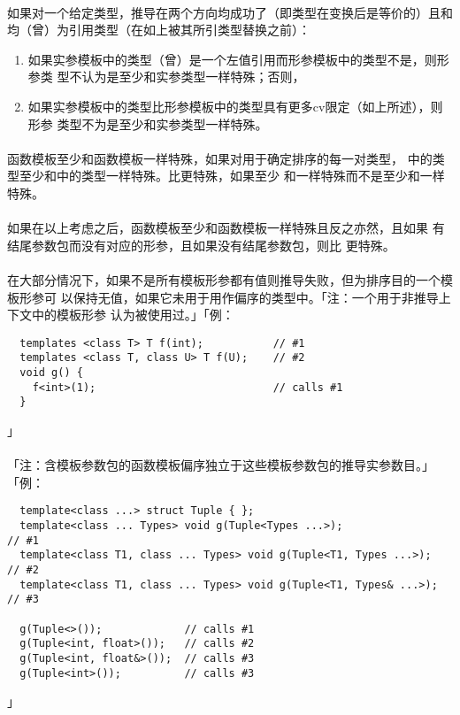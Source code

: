 \paragraph{}
如果对一个给定类型，推导在两个方向均成功了（即类型在变换后是等价的）且和
均（曾）为引用类型（在如上被其所引类型替换之前）：
\begin{enumerate}
  \item{如果实参模板中的类型（曾）是一个左值引用而形参模板中的类型不是，则形参类
    型不认为是至少和实参类型一样特殊；否则，}
  \item{如果实参模板中的类型比形参模板中的类型具有更多cv限定（如上所述），则形参
    类型不为是至少和实参类型一样特殊。}
\end{enumerate}

\paragraph{}
函数模板至少和函数模板一样特殊，如果对用于确定排序的每一对类型，
中的类型至少和中的类型一样特殊。比更特殊，如果至少
和一样特殊而不是至少和一样特殊。

\paragraph{}
如果在以上考虑之后，函数模板至少和函数模板一样特殊且反之亦然，且如果
有结尾参数包而没有对应的形参，且如果没有结尾参数包，则比
更特殊。

\paragraph{}
在大部分情况下，如果不是所有模板形参都有值则推导失败，但为排序目的一个模板形参可
以保持无值，如果它未用于用作偏序的类型中。「注：一个用于非推导上下文中的模板形参
认为被使用过。」「例：
\begin{lstlisting}
  templates <class T> T f(int);           // #1
  templates <class T, class U> T f(U);    // #2
  void g() {
    f<int>(1);                            // calls #1
  }
\end{lstlisting}」

\paragraph{}
「注：含模板参数包的函数模板偏序独立于这些模板参数包的推导实参数目。」「例：
\begin{lstlisting}
  template<class ...> struct Tuple { };
  template<class ... Types> void g(Tuple<Types ...>);                 // #1
  template<class T1, class ... Types> void g(Tuple<T1, Types ...>);   // #2
  template<class T1, class ... Types> void g(Tuple<T1, Types& ...>);  // #3

  g(Tuple<>());             // calls #1
  g(Tuple<int, float>());   // calls #2
  g(Tuple<int, float&>());  // calls #3
  g(Tuple<int>());          // calls #3
\end{lstlisting}」

